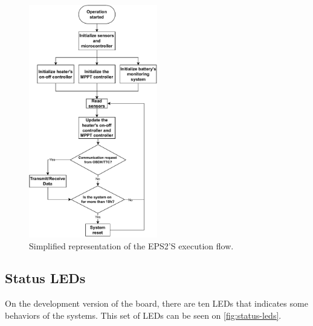 \begin{figure}[!ht]
    \begin{center}
        \includegraphics[width=0.5\textwidth]{figures/execution_flow.pdf}
        \caption{Simplified representation of the EPS2'S execution flow.}
        \label{fig:execution-flow}
    \end{center}
\end{figure}




\subsection{Status LEDs} \label{status-leds}

On the development version of the board, there are ten LEDs that indicates some behaviors of the systems. This set of LEDs can be seen on \autoref{fig:status-leds}.

